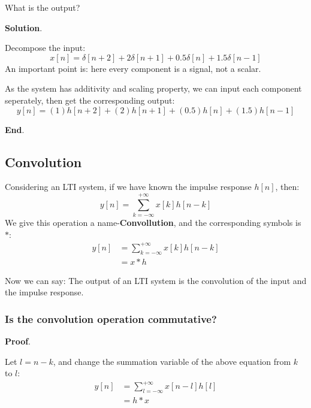     \noindent What is the output?

    \noindent \textbf{Solution}.

    Decompose the input:
        \begin{equation}
            x[n] = \delta[n+2] + 2\delta[n+1] + 0.5\delta[n] + 1.5\delta[n-1]                       
        \end{equation}
    An important point is: here every component is a signal, not a scalar.

    As the system has additivity and scaling property, we can input each component seperately,
    then get the corresponding output:
        \begin{equation}
            y[n] = (1)h[n+2] + (2)h[n+1] + (0.5)h[n] + (1.5)h[n-1]
        \end{equation}
    
    \noindent \textbf{End}.

    \subsection{Convolution}
    Considering an LTI system, if we have known the impulse response $h[n]$, then:
        \begin{equation}
            y[n] = \sum_{k=-\infty}^{+\infty} x[k] h[n-k]
        \end{equation}
    We give this operation a name-\textbf{Convollution}, and the corresponding symbols is $\ast$:
        \begin{equation}
            \begin{aligned}
                y[n] &= \sum_{k=-\infty}^{+\infty} x[k] h[n-k] \\
                     &= x \ast h
            \end{aligned}
        \end{equation}
    
    Now we can say: The output of an LTI system is the convolution of the input and the impulse response.

    \subsubsection{Is the convolution operation commutative?}

    \noindent \textbf{Proof}.

    Let $l=n-k$, and change the summation variable of the above equation from $k$ to $l$:
        \begin{equation}
            \begin{aligned}
                y[n] &= \sum_{l=-\infty}^{+\infty} x[n-l] h[l] \\
                     &= h \ast x
            \end{aligned}
        \end{equation}
    
